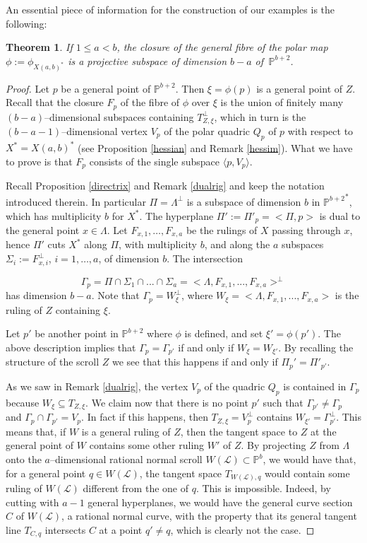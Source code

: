 \documentclass[11pt]{article}   %
\newtheorem{Theorem}{Theorem}
\theoremstyle{definition}
\numberwithin{Theorem}{section} \numberwithin{equation}{section}
\renewcommand{\L}{{\mathcal L}}
\newcommand{\p}{{\mathbb P}}
\begin{document}
{An essential piece of information for the construction of our examples
is the following:


\begin{Theorem}\label{fibrespace} If $1\leq a<b$, the closure
of the general fibre of the polar map $\phi:=\phi_{X(a,b)^ *}$ is a
projective subspace of dimension $b-a$ of $\,\p^ {b+2}$.
\end {Theorem}

\begin{proof} Let $p$ be a general point of $\p^ {b+2}$. Then $\xi=\phi(p)$
is a general point of $Z$. Recall that the closure $F_p$ of the fibre of $\phi$
over $\xi$ is the union of finitely many $(b-a)$--dimensional subspaces
containing $T_{Z,\xi}^ \perp$, which in turn is the $(b-a-1)$--dimensional
vertex $V_p$ of the polar quadric
$Q_p$ of $p$ with respect to $X^*=X(a,b)^ *$ (see Proposition
\ref {hessian}  and Remark \ref {hessim}).  What we have to prove is that
$F_p$ consists of the single subspace $\langle p,V_p\rangle$.

Recall Proposition \ref {directrix} and
Remark \ref  {dualrig} and keep the notation introduced
therein. In particular $\Pi=\Lambda^ \perp$ is a subspace of dimension $b$
in ${\p^ {b+2}}^ *$, which has multiplicity $b$ for $X^ *$.
The hyperplane $\Pi':=\Pi'_p=<\Pi,p>$ is dual to the general point $x\in \Lambda$.
Let $F_{x,1},\dots, F_{x,a}$ be the rulings of $X$ passing through $x$, hence
$\Pi'$ cuts $X^ *$ along $\Pi$, with
multiplicity $b$, and along the $a$ subspaces $\Sigma_i:=F_{x,i}^ \perp$,
$i=1,\dots,a$, of dimension $b$.
The intersection

$$\Gamma_p=\Pi \cap  \Sigma_1\cap...\cap
\Sigma_a=<\Lambda, F_{x,1},...,F_{x,a}>^ \perp$$
has dimension $b-a$. Note that $\Gamma_p=W_\xi^ \perp$, where
$W_\xi=<\Lambda, F_{x,1},...,F_{x,a}>$ is the ruling of $Z$ containing $\xi$.


Let $p'$ be another point in $\p^ {b+2}$ where $\phi$ is defined, and
set $\xi'=\phi(p')$. The above description implies that $\Gamma_p=\Gamma_{p'}$
if and only if $W_\xi=W_{\xi'}$. By recalling the structure of the
scroll $Z$ we see that this happens if and only if $\Pi_p'=\Pi'_{p'}$.

As we saw in Remark \ref  {dualrig},
the vertex $V_p$ of the quadric $Q_p$ is contained in $\Gamma_p$ because $W_\xi\subseteq T_{Z,\xi}$.
We claim now that there is no point $p'$ such that $\Gamma_{p'}\neq
\Gamma_p$ and $\Gamma_p\cap\Gamma_{p'}=V_p$. In fact
if this happens, then $T_{Z,\xi}=V_p^ \perp$ contains $W_{\xi'}=\Gamma_{p'}^ \perp$.
This means that, if $W$ is a general ruling of $Z$, then
 the tangent space to $Z$ at the general point of $W$
contains some other ruling $W'$ of $Z$. By projecting $Z$ from $\Lambda$ onto
the $a$--dimensional rational normal scroll $W(\L)\subset\p^b$,
we would have that, for a general point $q\in W(\L)$,
the tangent space $T_{W(\L),q}$  would contain
some ruling of $W(\L)$ different from the one of $q$.
This is impossible. Indeed, by cutting with $a-1$ general
hyperplanes, we would have
the general curve section $C$ of $W(\L)$,
a rational normal curve, with
the property that its general tangent line $T_{C,q}$ intersects $C$ at a point
$q'\neq q$, which is clearly not the case.


\end{proof}}
\end{document}
